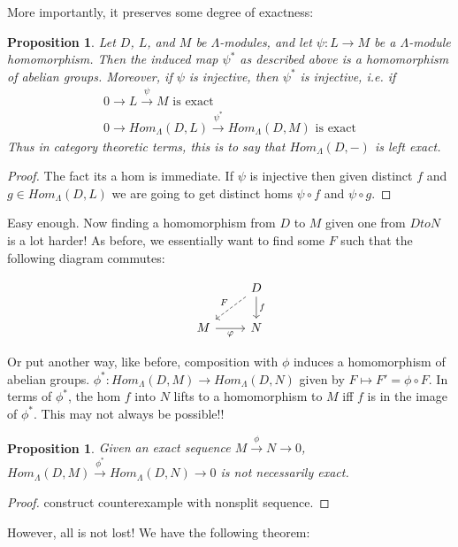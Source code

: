 \documentclass[12pt]{book}
\newtheorem{proposition}[theorem]{Proposition}
\theoremstyle{definition}
\begin{document}
More importantly, it preserves some degree of exactness: 


\begin{proposition}
    Let $D$, $L$, and $M$ be $\Lambda$-modules, and let $\psi : L \to M$ be a $\Lambda$-module homomorphism. Then the induced map $\psi^*$ as described above is a homomorphism of abelian groups. Moreover, if $\psi$ is injective, then $\psi^*$ is injective, i.e. if 
    \begin{align*}
        0 \rightarrow L \xrightarrow{\psi} M \text{ is exact}\\
        0 \rightarrow Hom_\Lambda(D,L) \xrightarrow{\psi^*} Hom_\Lambda(D,M) \text{ is exact}
    \end{align*}
    Thus in category theoretic terms, this is to say that $Hom_\Lambda(D,-)$ is left exact. 
\end{proposition}
\begin{proof}
    The fact its a hom is immediate. If $\psi$ is injective then given distinct $f$ and $g \in Hom_\Lambda(D,L)$ we are going to get distinct homs $\psi \circ f $ and $\psi \circ g$. 
\end{proof}

Easy enough. Now finding a homomorphism from $D$ to $M$ given one from $D to N$ is a lot harder! As before, we essentially want to find some $F$ such that the following diagram commutes: 

\[
\begin{tikzcd}
& D \arrow[d, "f"] \arrow[dl, "F"', dashed] \\
M \arrow[r, "\varphi"'] & N
\end{tikzcd}
\]

Or put another way, like before, composition with $\phi$ induces a homomorphism of abelian groups. $\phi^* : Hom_\Lambda(D,M) \to Hom_\Lambda(D,N)$ given by $F \mapsto F' = \phi \circ F$. In terms of $\phi^*$, the hom $f$ into $N$ lifts to a homomorphism to $M$ iff $f$ is in the image of $\phi^*$. This may not always be possible!!

\begin{proposition}
    Given an exact sequence $M \xrightarrow{\phi} N \rightarrow 0$, $ Hom_\Lambda(D,M) \xrightarrow{\phi^*} Hom_\Lambda(D,N) \rightarrow 0$ is not necessarily exact.  
\end{proposition}
\begin{proof}
    construct counterexample with nonsplit sequence. 
\end{proof}

However, all is not lost! We have the following theorem: 
\end{document}
